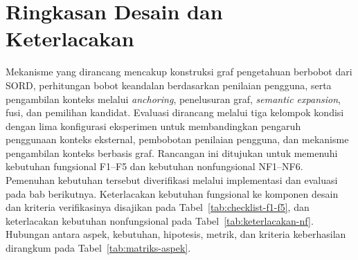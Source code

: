 
\section{Ringkasan Desain dan Keterlacakan}
\label{sec:ringkasan-desain}

Mekanisme yang dirancang mencakup konstruksi graf pengetahuan berbobot dari SORD, perhitungan bobot keandalan berdasarkan penilaian pengguna, serta pengambilan konteks melalui \emph{anchoring}, penelusuran graf, \emph{semantic expansion}, fusi, dan pemilihan kandidat. Evaluasi dirancang melalui tiga kelompok kondisi dengan lima konfigurasi eksperimen untuk membandingkan pengaruh penggunaan konteks eksternal, pembobotan penilaian pengguna, dan mekanisme pengambilan konteks berbasis graf. Rancangan ini ditujukan untuk memenuhi kebutuhan fungsional F1--F5 dan kebutuhan nonfungsional NF1--NF6. Pemenuhan kebutuhan tersebut diverifikasi melalui implementasi dan evaluasi pada bab berikutnya. Keterlacakan kebutuhan fungsional ke komponen desain dan kriteria verifikasinya disajikan pada Tabel~\ref{tab:checklist-f1-f5}, dan keterlacakan kebutuhan nonfungsional pada Tabel~\ref{tab:keterlacakan-nf}. Hubungan antara aspek, kebutuhan, hipotesis, metrik, dan kriteria keberhasilan dirangkum pada Tabel~\ref{tab:matriks-aspek}.

